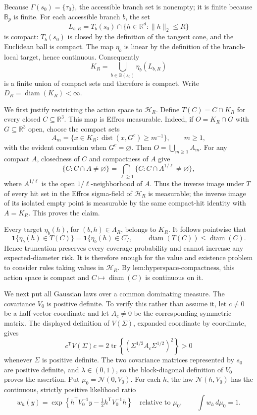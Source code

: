 Because \(\Gamma(s_0)=\{\tau_0\}\), the accessible branch set is nonempty; it is finite because \(\mathbb B_p\) is finite.  For each accessible branch \(b\), the set
\[
L_{b,R}=T_b(s_0)\cap\{h\in\mathbb R^d:\|h\|_2\le R\}
\]
is compact: \(T_b(s_0)\) is closed by the definition of the tangent cone, and the Euclidean ball is compact.  The map \(\eta_b\) is linear by the definition of the branch-local target, hence continuous.  Consequently
\[
K_R=\bigcup_{b\in\mathbb B(s_0)}\eta_b(L_{b,R})
\]
is a finite union of compact sets and therefore is compact.  Write \(D_R=\operatorname{diam}(K_R)<\infty\).

We first justify restricting the action space to \(\mathcal H_R\).  Define \(T(C)=C\cap K_R\) for every closed \(C\subseteq\mathbb R^3\).  This map is Effros measurable.  Indeed, if \(O=K_R\cap G\) with \(G\subseteq\mathbb R^3\) open, choose the compact sets
\[
A_m=\{x\in K_R:\operatorname{dist}(x,G^c)\ge m^{-1}\},\qquad m\ge1,
\]
with the evident convention when \(G^c=\varnothing\).  Then \(O=\bigcup_{m\ge1}A_m\).  For any compact \(A\), closedness of \(C\) and compactness of \(A\) give
\[
\{C:C\cap A\ne\varnothing\}
=\bigcap_{\ell\ge1}\{C:C\cap A^{1/\ell}\ne\varnothing\},
\]
where \(A^{1/\ell}\) is the open \(1/\ell\)-neighborhood of \(A\).  Thus the inverse image under \(T\) of every hit set in the Effros sigma-field of \(\mathcal H_R\) is measurable; the inverse image of its isolated empty point is measurable by the same compact-hit identity with \(A=K_R\).  This proves the claim.

Every target \(\eta_b(h)\), for \((b,h)\in\Lambda_R\), belongs to \(K_R\).  It follows pointwise that
\[
\mathbf 1\{\eta_b(h)\in T(C)\}=\mathbf 1\{\eta_b(h)\in C\},
\qquad
\operatorname{diam}(T(C))\le\operatorname{diam}(C).
\]
Hence truncation preserves every coverage probability and cannot increase any expected-diameter risk.  It is therefore enough for the value and existence problem to consider rules taking values in \(\mathcal H_R\).  By \(\text{lem:hyperspace-compactness}\), this action space is compact and \(C\mapsto\operatorname{diam}(C)\) is continuous on it.

We next put all Gaussian laws over a common dominating measure.  The covariance \(V_0\) is positive definite.  To verify this rather than assume it, let \(c\ne0\) be a half-vector coordinate and let \(A_c\ne0\) be the corresponding symmetric matrix.  The displayed definition of \(V(\Sigma)\), expanded coordinate by coordinate, gives
\[
c^{\mathsf T}V(\Sigma)c
=2\operatorname{tr}\!\left\{(\Sigma^{1/2}A_c\Sigma^{1/2})^2\right\}>0
\]
whenever \(\Sigma\) is positive definite.  The two covariance matrices represented by \(s_0\) are positive definite, and \(\lambda\in(0,1)\), so the block-diagonal definition of \(V_0\) proves the assertion.  Put \(\mu_0=\mathcal N(0,V_0)\).  For each \(h\), the law \(\mathcal N(h,V_0)\) has the continuous, strictly positive likelihood ratio
\[
w_h(y)=\exp\!\left\{h^{\mathsf T}V_0^{-1}y-\tfrac12h^{\mathsf T}V_0^{-1}h\right\}
\quad\text{relative to }\mu_0,
\qquad
\int w_h\,d\mu_0=1.
\]

